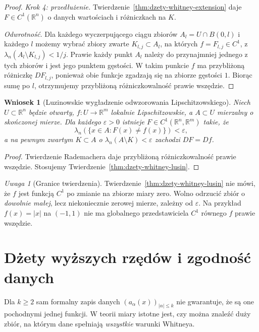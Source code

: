 \documentclass[11pt,a4paper,oneside]{book}
\numberwithin{equation}{chapter}
\theoremstyle{plain}
\newtheorem{wniosek}[twierdzenie]{Wniosek}
\theoremstyle{definition}
\theoremstyle{remark}
\newtheorem{uwaga}[twierdzenie]{Uwaga}
\begin{document}
\begin{proof}
\emph{Krok 4: przedłużenie.}
Twierdzenie~\ref{thm:dzety-whitney-extension}
daje $F\in C^1(\mathbb R^n)$ o danych wartościach
i różniczkach na $K$.

\emph{Odwrotność.}
Dla każdego wyczerpującego ciągu zbiorów
$A_l=U\cap B(0,l)$ i każdego $l$ możemy wybrać
zbiory zwarte $K_{l,j}\subset A_l$, na których
$f=F_{l,j}\in C^1$, z
$\lambda_n(A_l\setminus K_{l,j})<1/j$.
Prawie każdy punkt $A_l$ należy do przynajmniej
jednego z tych zbiorów i jest jego punktem gęstości.
W takim punkcie $f$ ma przybliżoną różniczkę
$DF_{l,j}$, ponieważ obie funkcje zgadzają się na
zbiorze gęstości $1$. Biorąc sumę po $l$,
otrzymujemy przybliżoną różniczkowalność prawie wszędzie.
\end{proof}

\begin{wniosek}[Luzinowskie wygładzenie odwzorowania Lipschitzowskiego]
\label{cor:dzety-lusin-lipschitz}
Niech $U\subset\mathbb R^n$ będzie otwarty,
$f:U\to\mathbb R^m$ lokalnie Lipschitzowskie,
a $A\subset U$ mierzalny o skończonej mierze.
Dla każdego $\varepsilon>0$ istnieje
$F\in C^1(\mathbb R^n,\mathbb R^m)$ takie, że
\[
 \lambda_n(\{x\in A:F(x)\ne f(x)\})<\varepsilon,
\]
a na pewnym zwartym $K\subset A$ o
$\lambda_n(A\setminus K)<\varepsilon$ zachodzi
$DF=Df$.
\end{wniosek}
\begin{proof}
Twierdzenie Rademachera daje przybliżoną
różniczkowalność prawie wszędzie.
Stosujemy Twierdzenie~\ref{thm:dzety-whitney-lusin}.
\end{proof}

\begin{uwaga}[Granice twierdzenia]
Twierdzenie~\ref{thm:dzety-whitney-lusin} nie mówi,
że $f$ jest funkcją $C^1$ po zmianie na zbiorze miary zero.
Wolno odrzucić zbiór o \emph{dowolnie małej}, lecz niekoniecznie
zerowej mierze, zależny od $\varepsilon$.
Na przykład $f(x)=|x|$ na $(-1,1)$ nie ma globalnego
przedstawiciela $C^1$ równego $f$ prawie wszędzie.
\end{uwaga}

\section{Dżety wyższych rzędów i zgodność danych}
Dla $k\ge2$ sam formalny zapis danych
$(a_\alpha(x))_{|\alpha|\le k}$ nie gwarantuje,
że są one pochodnymi jednej funkcji. W teorii miary
istotne jest, czy można znaleźć duży zbiór, na którym
dane spełniają \emph{wszystkie} warunki Whitneya.
\end{document}
